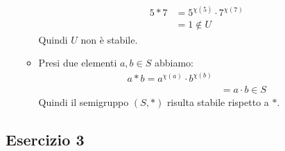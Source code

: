 \begin{enumerate}[label=(\textit{\roman*})]
\begin{itemize}
		\begin{align*}
			5 \ast 7 &= 5^{\chi(5)} \cdot 7^{\chi(7)} \\
			&= 1 \notin U
		\end{align*}
		Quindi $U$ non è stabile.
		\item Presi due elementi $a,b \in S$ abbiamo:
		\begin{align*}
			a \ast b = a^{\chi(a)} \cdot b^{\chi(b)} \\
			&= a \cdot b \in S
		\end{align*}
		Quindi il semigruppo $(S,\ast)$ risulta stabile rispetto a $\ast$.
	\end{itemize}
\end{enumerate}
\subsection*{Esercizio 3}
